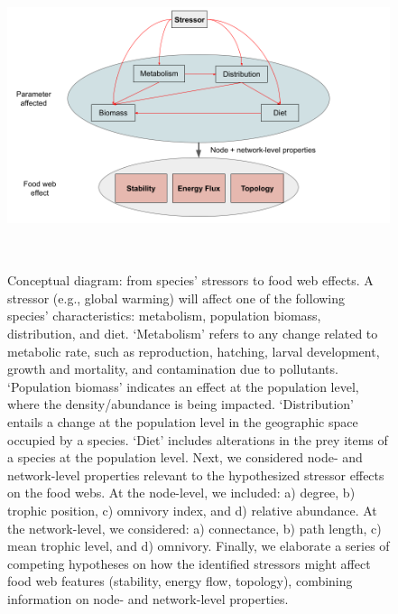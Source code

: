 \documentclass[
]{article}
\begin{document}
\begin{figure}
\centering
\includegraphics[width=6.27in,height=3.528in]{Figures/Figure2_StressorDiagram.png}
\caption{Conceptual diagram: from species' stressors to food web
effects. A stressor (e.g., global warming) will affect one of the
following species' characteristics: metabolism, population biomass,
distribution, and diet. `Metabolism' refers to any change related to
metabolic rate, such as reproduction, hatching, larval development,
growth and mortality, and contamination due to pollutants. `Population
biomass' indicates an effect at the population level, where the
density/abundance is being impacted. `Distribution' entails a change at
the population level in the geographic space occupied by a species.
`Diet' includes alterations in the prey items of a species at the
population level. Next, we considered node- and network-level properties
relevant to the hypothesized stressor effects on the food webs. At the
node-level, we included: a) degree, b) trophic position, c) omnivory
index, and d) relative abundance. At the network-level, we considered:
a) connectance, b) path length, c) mean trophic level, and d) omnivory.
Finally, we elaborate a series of competing hypotheses on how the
identified stressors might affect food web features (stability, energy
flow, topology), combining information on node- and network-level
properties.}
\end{figure}
\end{document}
